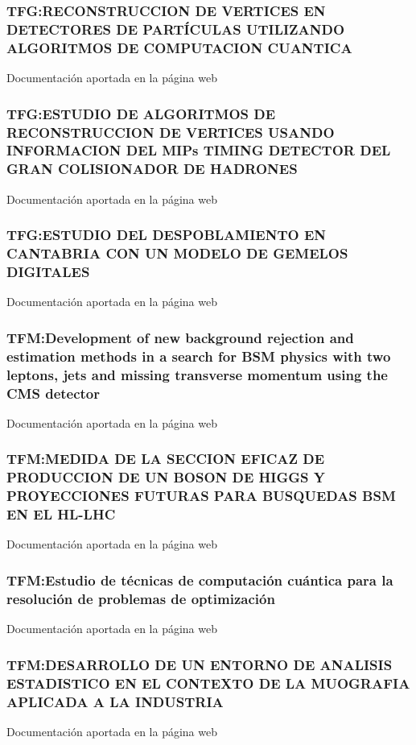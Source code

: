 \documentclass[a4paper, 11pt, twoside, openright]{report}
\begin{document}
\subsubsection{TFG:RECONSTRUCCION DE VERTICES EN DETECTORES DE PARTÍCULAS UTILIZANDO ALGORITMOS DE COMPUTACION CUANTICA}
Documentación aportada en la página web

\subsubsection{TFG:ESTUDIO DE ALGORITMOS DE RECONSTRUCCION DE VERTICES USANDO INFORMACION DEL MIPs TIMING DETECTOR DEL GRAN COLISIONADOR DE HADRONES}
Documentación aportada en la página web

\subsubsection{TFG:ESTUDIO DEL DESPOBLAMIENTO EN CANTABRIA CON UN MODELO DE GEMELOS DIGITALES}
Documentación aportada en la página web

\subsubsection{TFM:Development of new background rejection and estimation methods in a search for BSM physics with two leptons, jets and missing transverse momentum using the CMS detector}
Documentación aportada en la página web

\subsubsection{TFM:MEDIDA DE LA SECCION EFICAZ DE PRODUCCION DE UN BOSON DE HIGGS Y PROYECCIONES FUTURAS PARA BUSQUEDAS BSM EN EL HL-LHC}
Documentación aportada en la página web

\subsubsection{TFM:Estudio de técnicas de computación cuántica para la resolución de problemas de optimización}
Documentación aportada en la página web

\subsubsection{TFM:DESARROLLO DE UN ENTORNO DE ANALISIS ESTADISTICO EN EL CONTEXTO DE LA MUOGRAFIA APLICADA A LA INDUSTRIA}
Documentación aportada en la página web
\end{document}
